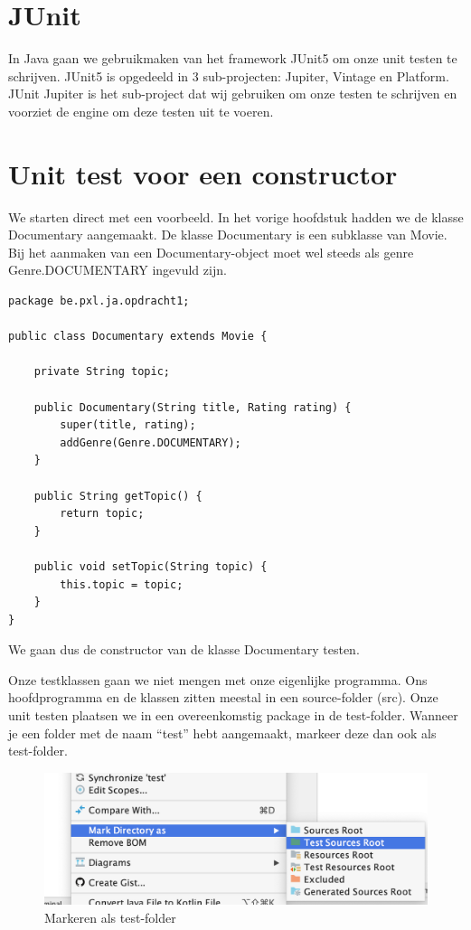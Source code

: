 \documentclass{tstextbook}
\begin{document}
\section{JUnit}

In Java gaan we gebruikmaken van het framework JUnit5 om onze unit testen te schrijven.
JUnit5 is opgedeeld in 3 sub-projecten:  Jupiter, Vintage en Platform. JUnit Jupiter is het  sub-project dat wij gebruiken om onze testen te schrijven en voorziet de engine om deze testen uit te voeren.

\section{Unit test voor een constructor}

We starten direct met een voorbeeld. In het vorige hoofdstuk hadden we de klasse Documentary aangemaakt. De klasse Documentary is een subklasse van Movie. Bij het aanmaken van een Documentary-object moet wel steeds als genre Genre.DOCUMENTARY ingevuld zijn. 

\begin{lstlisting}
package be.pxl.ja.opdracht1;

public class Documentary extends Movie {

	private String topic;

	public Documentary(String title, Rating rating) {
		super(title, rating);
		addGenre(Genre.DOCUMENTARY);
	}

	public String getTopic() {
		return topic;
	}

	public void setTopic(String topic) {
		this.topic = topic;
	}
}
\end{lstlisting}

We gaan dus de constructor van de klasse Documentary testen.

Onze testklassen gaan we niet mengen met onze eigenlijke programma. Ons hoofdprogramma en de klassen zitten meestal in een source-folder (src). Onze unit testen plaatsen we in een overeenkomstig package in de test-folder. Wanneer je een folder met de naam ``test'' hebt aangemaakt, markeer deze dan ook als test-folder.

\begin{figure}[H]
  \includegraphics[width=\linewidth]{images/h1/test_directory.png}
  \caption{Markeren als test-folder}
  \label{fig:test_folder}
\end{figure}
\end{document}
